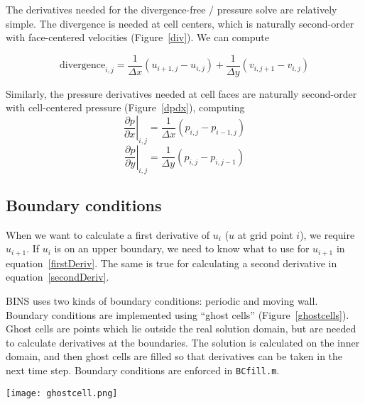 \documentclass[12pt]{article}
\begin{document}
The derivatives needed for the divergence-free / pressure solve are relatively simple.  The divergence is needed at cell centers, which is naturally second-order with face-centered velocities (Figure~\ref{div}). We can compute

\[ \text{divergence}_{i,j} = \frac{1}{\Delta x}\left( u_{i+1,j}-u_{i,j}\right) + \frac{1}{\Delta y}\left( v_{i,j+1}-v_{i,j}\right) \]

Similarly, the pressure derivatives needed at cell faces are naturally second-order with cell-centered pressure (Figure~\ref{dpdx}), computing
\[ \left.\frac{\partial p}{\partial x}\right|_{i,j} = \frac{1}{\Delta x}\left( p_{i,j} - p_{i-1,j}\right)\]
\[ \left.\frac{\partial p}{\partial y}\right|_{i,j} = \frac{1}{\Delta y}\left( p_{i,j} - p_{i,j-1}\right)\]

\begin{center}
\begin{figure*}
\center
{}  
\caption{First derivatives for the divergence-free / pressure solve.}
\label{pressDeriv}
\end{figure*}
\end{center}



\FloatBarrier
\subsection{Boundary conditions}
\label{BCs}
When we want to calculate a first derivative of $u_i$ ($u$ at grid point $i$), we require $u_{i+1}$.  If $u_i$ is on an upper boundary, we need to know what to use for $u_{i+1}$ in equation~\ref{firstDeriv}.  The same is true for calculating a second derivative in equation~\ref{secondDeriv}.

BINS uses two kinds of boundary conditions: periodic and moving wall.  Boundary conditions are implemented using ``ghost cells'' (Figure~\ref{ghostcells}).  Ghost cells are points which lie outside the real solution domain, but are needed to calculate derivatives at the boundaries.  The solution is calculated on the inner domain, and then ghost cells are filled so that derivatives can be taken in the next time step.  Boundary conditions are enforced in \texttt{BCfill.m}.

\begin{center}
\begin{figure*}
\center
\texttt{[image: ghostcell.png]} 
\caption{Ghostcells outside the boundary of the domain.}
\label{ghostcells}
\end{figure*}
\end{center}
\end{document}
